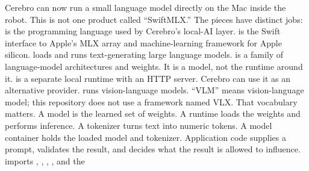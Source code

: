 {}
\markdownRendererSectionEnd 
\markdownRendererSectionEnd \markdownRendererSectionBegin
{}\markdownRendererInterblockSeparator
{}Cerebro can now run a small language model directly on the Mac inside the\markdownRendererSoftLineBreak
{}robot. This is not one product called “SwiftMLX.” The pieces have distinct\markdownRendererSoftLineBreak
{}jobs:\markdownRendererInterblockSeparator
{}\markdownRendererUlBegin
\markdownRendererUlItem {} is the programming language used by Cerebro's local-AI layer.\markdownRendererUlItemEnd 
\markdownRendererUlItem {} is the Swift interface to Apple's MLX array and machine-learning\markdownRendererSoftLineBreak
{}framework for Apple silicon.\markdownRendererUlItemEnd 
\markdownRendererUlItem {} loads and runs text-generating large language models.\markdownRendererUlItemEnd 
\markdownRendererUlItem {} is a family of language-model architectures and weights. It is a\markdownRendererSoftLineBreak
{}model, not the runtime around it.\markdownRendererUlItemEnd 
\markdownRendererUlItem {} is a separate local runtime with an HTTP server. Cerebro can\markdownRendererSoftLineBreak
{}use it as an alternative provider.\markdownRendererUlItemEnd 
\markdownRendererUlItem {} runs vision-language models. “VLM” means vision-language model;\markdownRendererSoftLineBreak
{}this repository does not use a framework named VLX.\markdownRendererUlItemEnd 
\markdownRendererUlEnd \markdownRendererInterblockSeparator
{}That vocabulary matters. A model is the learned set of weights. A runtime\markdownRendererSoftLineBreak
{}loads the weights and performs inference. A tokenizer turns text into numeric\markdownRendererSoftLineBreak
{}tokens. A model container holds the loaded model and tokenizer. Application\markdownRendererSoftLineBreak
{}code supplies a prompt, validates the result, and decides what the result is\markdownRendererSoftLineBreak
{}allowed to influence.\markdownRendererInterblockSeparator
{}\markdownRendererSectionBegin
{}\markdownRendererInterblockSeparator
{} imports , , , , and the\markdownRendererSoftLineBreak

